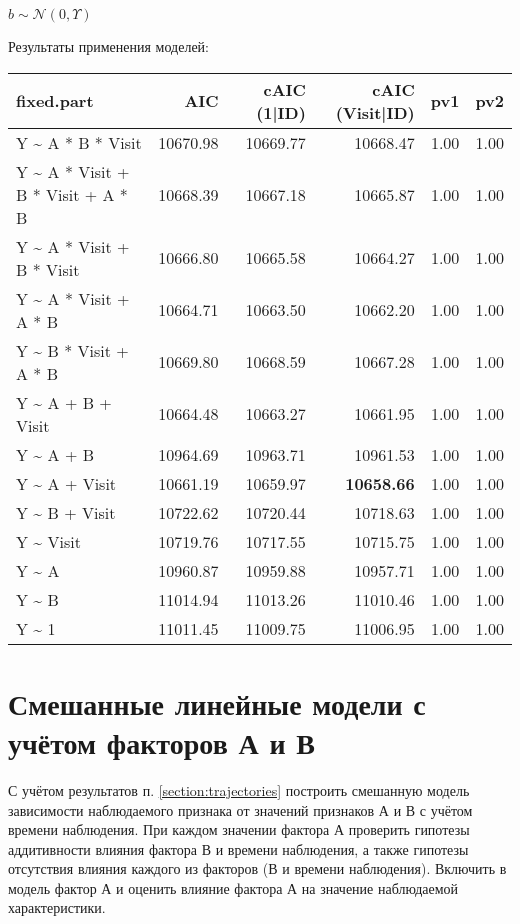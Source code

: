 \documentclass[a4paper,12pt]{article}
\begin{document}
$ b \sim \mathcal N(0,  \Upsilon) $

Результаты применения моделей: \\

\begin{table}[H]
    \centering
    \begin{tabular}{lrrrrr}
        \hline
        fixed.part & AIC & cAIC (1|ID) & cAIC (Visit|ID) & pv1 & pv2 \\
        \hline
        Y \~{} A * B * Visit & 10670.98 & 10669.77 & 10668.47 & 1.00 & 1.00 \\
        Y \~{} A * Visit + B * Visit + A * B & 10668.39 & 10667.18 & 10665.87 & 1.00 & 1.00 \\
        Y \~{} A * Visit + B * Visit & 10666.80 & 10665.58 & 10664.27 & 1.00 & 1.00 \\
        Y \~{} A * Visit + A * B & 10664.71 & 10663.50 & 10662.20 & 1.00 & 1.00 \\
        Y \~{} B * Visit + A * B & 10669.80 & 10668.59 & 10667.28 & 1.00 & 1.00 \\
        Y \~{} A + B + Visit & 10664.48 & 10663.27 & 10661.95 & 1.00 & 1.00 \\
        Y \~{} A + B & 10964.69 & 10963.71 & 10961.53 & 1.00 & 1.00 \\
        Y \~{} A + Visit & 10661.19 & 10659.97 & \textbf{10658.66} & 1.00 & 1.00 \\
        Y \~{} B + Visit & 10722.62 & 10720.44 & 10718.63 & 1.00 & 1.00 \\
        Y \~{} Visit & 10719.76 & 10717.55 & 10715.75 & 1.00 & 1.00 \\
        Y \~{} A & 10960.87 & 10959.88 & 10957.71 & 1.00 & 1.00 \\
        Y \~{} B & 11014.94 & 11013.26 & 11010.46 & 1.00 & 1.00 \\
        Y \~{} 1 & 11011.45 & 11009.75 & 11006.95 & 1.00 & 1.00 \\
        \hline
    \end{tabular}
\end{table}


\section{ Смешанные линейные модели с учётом факторов А и В }

\begin{leftbar}
С учётом результатов п. \ref{section:trajectories} построить смешанную модель зависимости наблюдаемого признака от значений признаков А и В с учётом времени наблюдения.
При каждом значении фактора А проверить гипотезы аддитивности влияния фактора В и времени наблюдения, а также гипотезы отсутствия влияния каждого из факторов (В и времени наблюдения).
Включить в модель фактор А и оценить влияние фактора А на значение наблюдаемой характеристики.
\end{leftbar}
\end{document}
